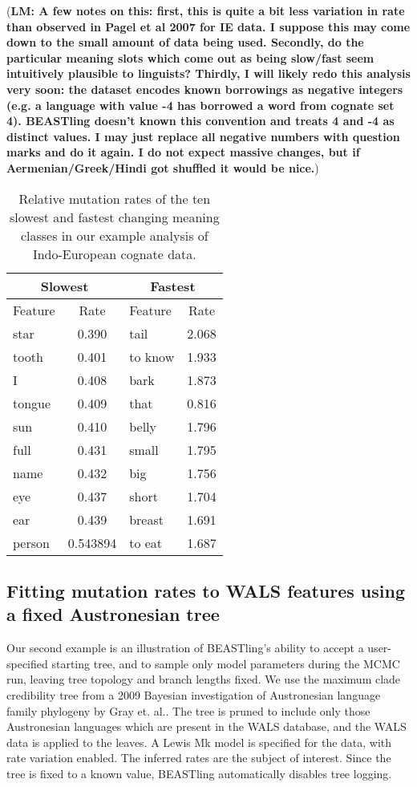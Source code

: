 \documentclass[twocolumn,10pt]{scrartcl}
\begin{document}
(\textbf{LM: A few notes on this: first, this is quite a bit less variation in rate than observed in Pagel et al 2007 for IE data.  I suppose this may come down to the small amount of data being used.  Secondly, do the particular meaning slots which come out as being slow/fast seem intuitively plausible to linguists?  Thirdly, I will likely redo this analysis very soon: the dataset encodes known borrowings as negative integers (e.g. a language with value -4 has borrowed a word from cognate set 4).  BEASTling doesn't known this convention and treats 4 and -4 as distinct values.  I may just replace all negative numbers with question marks and do it again.  I do  not expect massive changes, but if Aermenian/Greek/Hindi got shuffled it would be nice.})
\begin{table}[t]
	\begin{center}
	\begin{tabular}{|l|c||l|c|}
		\hline
		\multicolumn{2}{|c||}{Slowest} & \multicolumn{2}{|c|}{Fastest} \\ \hline
		Feature & Rate  & Feature & Rate \\ \hline
		star & 0.390 & tail & 2.068 \\
		tooth & 0.401 & to know & 1.933 \\
		I & 0.408 & bark & 1.873 \\
		tongue & 0.409 & that & 0.816 \\
		sun & 0.410 & belly & 1.796 \\
		full & 0.431 & small & 1.795 \\
		name & 0.432 & big & 1.756 \\
		eye & 0.437 & short & 1.704 \\
		ear & 0.439 & breast & 1.691 \\
		person & 0.543894 & to eat & 1.687 \\ \hline
	\end{tabular}
	\end{center}
	\caption{Relative mutation rates of the ten slowest and fastest changing meaning classes in our example analysis of Indo-European cognate data.}
\label{tab:ie}
\end{table}

\subsection{Fitting mutation rates to WALS features using a fixed Austronesian tree}

Our second example is an illustration of BEASTling's ability to accept a user-specified starting tree, and to sample only model parameters during the MCMC run, leaving tree topology and branch lengths fixed.  We use the maximum clade credibility tree from a 2009 Bayesian investigation of Austronesian language family phylogeny by Gray et. al.\cite{Gray2009}.  The tree is pruned to include only those Austronesian languages which are present in the WALS database, and the WALS data is applied to the leaves.  A Lewis Mk model is specified for the data, with rate variation enabled.  The inferred rates are the subject of interest.  Since the tree is fixed to a known value, BEASTling automatically disables tree logging.
\end{document}
